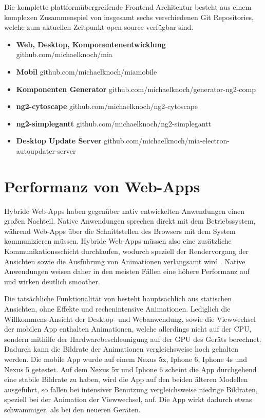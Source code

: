 Die komplette plattformübergreifende Frontend Architektur besteht aus einem komplexen Zusammenspiel von insgesamt sechs verschiedenen Git Repositories,
welche zum aktuellen Zeitpunkt open source verfügbar sind.

\begin{itemize}
  \item{\textbf{Web, Desktop, Komponentenentwicklung} github.com/michaelknoch/mia}
  \item{\textbf{Mobil} github.com/michaelknoch/miamobile}
  \item{\textbf{Komponenten Generator} github.com/michaelknoch/generator-ng2-comp}
  \item{\textbf{ng2-cytoscape} github.com/michaelknoch/ng2-cytoscape}
  \item{\textbf{ng2-simplegantt} github.com/michaelknoch/ng2-simplegantt}
  \item{\textbf{Desktop Update Server} github.com/michaelknoch/mia-electron-autoupdater-server}
\end{itemize}

\section{Performanz von Web-Apps}

Hybride Web-Apps haben gegenüber nativ entwickelten Anwendungen einen großen Nachteil.
Native Anwendungen sprechen direkt mit dem Betriebssystem, während Web-Apps
über die Schnittstellen des Browsers mit dem System kommunizieren müssen.
Hybride Web-Apps müssen also eine zusätzliche Kommunikationsschicht durchlaufen,
wodurch speziell der Rendervorgang der Ansichten sowie die Ausführung von Animationen verlangsamt wird \cite{Webvs43:online}.
Native Anwendungen weisen daher in den meisten Fällen eine höhere Performanz auf und wirken deutlich
smoother.

Die tatsächliche Funktionalität von \projectname{} besteht hauptsächlich aus statischen Ansichten, ohne Effekte und
rechenintensive Animationen. Lediglich die Willkommens-Ansicht der Desktop- und Webanwendung,
sowie die Viewwechsel der mobilen App enthalten Animationen, welche allerdings nicht auf der CPU,
sondern mithilfe der Hardwarebeschleunigung auf der GPU des Geräts berechnet.
Dadurch kann die Bildrate der Animationen vergleichsweise hoch gehalten werden.
Die mobile App wurde auf einem Nexus 5x, Iphone 6, Iphone 4s und Nexus 5 getestet.
Auf dem Nexus 5x und Iphone 6 scheint die App durchgehend eine stabile Bildrate zu haben,
wird die App auf den beiden älteren Modellen ausgeführt,
so fallen bei intensiver Benutzung vergleichsweise niedrige
Bildraten, speziell bei der Animation der Viewwechsel, auf.
Die App wirkt dadurch etwas schwammiger, als bei den neueren Geräten.

